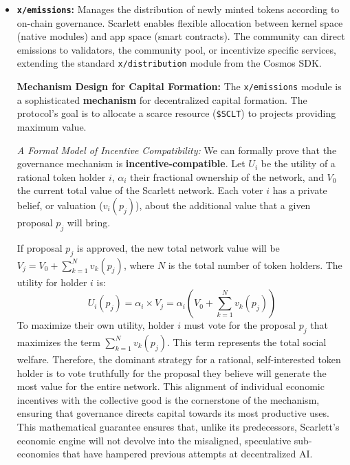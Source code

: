 \documentclass[10pt]{article}
\begin{document}
\begin{itemize}[leftmargin=*, itemsep=2pt]
    \item \textbf{\texttt{x/emissions}:} Manages the distribution of newly minted tokens according to on-chain governance. Scarlett enables flexible allocation between kernel space (native modules) and app space (smart contracts). The community can direct emissions to validators, the community pool, or incentivize specific services, extending the standard \texttt{x/distribution} module from the Cosmos SDK.
    
    \textbf{Mechanism Design for Capital Formation:} The \texttt{x/emissions} module is a sophisticated \textbf{mechanism} for decentralized capital formation. The protocol's goal is to allocate a scarce resource (\texttt{\$SCLT}) to projects providing maximum value.
    
    \textit{A Formal Model of Incentive Compatibility:} We can formally prove that the governance mechanism is \textbf{incentive-compatible}. Let \(U_i\) be the utility of a rational token holder \(i\), \(\alpha_i\) their fractional ownership of the network, and \(V_0\) the current total value of the Scarlett network. Each voter \(i\) has a private belief, or valuation (\(v_i(p_j)\)), about the additional value that a given proposal \(p_j\) will bring.
    
    If proposal \(p_j\) is approved, the new total network value will be \(V_j = V_0 + \sum_{k=1}^{N} v_k(p_j)\), where \(N\) is the total number of token holders. The utility for holder \(i\) is:
    \[ U_i(p_j) = \alpha_i \times V_j = \alpha_i \left( V_0 + \sum_{k=1}^{N} v_k(p_j) \right) \]
    To maximize their own utility, holder \(i\) must vote for the proposal \(p_j\) that maximizes the term \(\sum_{k=1}^{N} v_k(p_j)\). This term represents the total social welfare. Therefore, the dominant strategy for a rational, self-interested token holder is to vote truthfully for the proposal they believe will generate the most value for the entire network. This alignment of individual economic incentives with the collective good is the cornerstone of the mechanism, ensuring that governance directs capital towards its most productive uses. This mathematical guarantee ensures that, unlike its predecessors, Scarlett's economic engine will not devolve into the misaligned, speculative sub-economies that have hampered previous attempts at decentralized AI.


\end{itemize}
\end{document}
